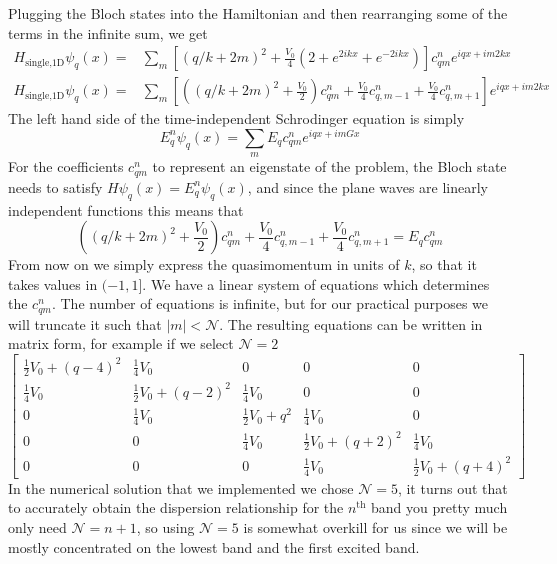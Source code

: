 \documentclass[11pt,letter]{article}
\newcommand{\vo}{\ensuremath{V_{0}}}
\begin{document}
Plugging the Bloch states into the Hamiltonian and then rearranging some of the terms in the infinite sum, we get 
\begin{equation}
\begin{split}
  H_{\text{single,1D}} \psi_{q}(x) = &  \sum_{m} \left[(q/k+2m)^{2} + \frac{\vo}{4}(2+e^{2ikx}+e^{-2ikx}) \right]
                     c_{qm}^{n} e^{iqx+im2kx} \\ 
  H_{\text{single,1D}} \psi_{q}(x) = &  \sum_{m} \left[ \left(  (q/k+2m)^{2} + \frac{\vo}{2} \right) c_{qm}^{n} 
                                     + \frac{\vo}{4}c_{q,m-1}^{n} + \frac{\vo}{4}c_{q,m+1}^{n} \right] 
                     e^{iqx+im2kx} 
\end{split}
\end{equation}
The left hand side of the time-independent Schrodinger equation is simply 
\begin{equation}
  E_{q}^{n}\psi_{q}(x) = \sum_{m} E_{q} c_{qm}^{n} e^{iqx+imGx}
\end{equation}
For the coefficients $c_{qm}^{n}$ to represent an eigenstate of the problem, the
Bloch state needs to satisfy $H\psi_{q}(x) = E_{q}^{n}\psi_{q}(x)$, and since the
plane waves are linearly independent functions this means that 
\begin{equation}
  \left(  (q/k+2m)^{2} + \frac{\vo}{2} \right) c_{qm}^{n} 
                                     + \frac{\vo}{4}c_{q,m-1}^{n} + \frac{\vo}{4}c_{q,m+1}^{n} = E_{q} c_{qm}^{n} 
\end{equation}
From now on we simply express the quasimomentum in units of $k$, so that it takes values in $(-1,1]$.  We have a linear system of equations which determines the $c_{qm}^{n}$.  The number of equations is infinite, but for our practical purposes we will truncate it such that $|m|<\mathcal{N}$.  The resulting equations can be written in matrix form, for example if we select $\mathcal{N}=2$
\begin{equation}
  \left[\begin{smallmatrix}\frac{1}{2} V_{{0}} + \left(q -4\right)^{2} & \frac{1}{4} V_{{0}} & 0 & 0 & 0\\\frac{1}{4} V_{{0}} & \frac{1}{2} V_{{0}} + \left(q -2\right)^{2} & \frac{1}{4} V_{{0}} & 0 & 0\\0 & \frac{1}{4} V_{{0}} & \frac{1}{2} V_{{0}} + q^{2} & \frac{1}{4} V_{{0}} & 0\\0 & 0 & \frac{1}{4} V_{{0}} & \frac{1}{2} V_{{0}} + \left(q + 2\right)^{2} & \frac{1}{4} V_{{0}}\\0 & 0 & 0 & \frac{1}{4} V_{{0}} & \frac{1}{2} V_{{0}} + \left(q + 4\right)^{2}\end{smallmatrix}\right]
\end{equation}
In the numerical solution that  we implemented we chose $\mathcal{N}=5$,  it
turns out that to accurately obtain the dispersion relationship for the
$n^\mathrm{th}$ band you pretty much only need $\mathcal{N}=n+1$, so using
$\mathcal{N}=5$ is somewhat overkill for us since we will be mostly
concentrated on the lowest band and the first excited band.  
\end{document}
